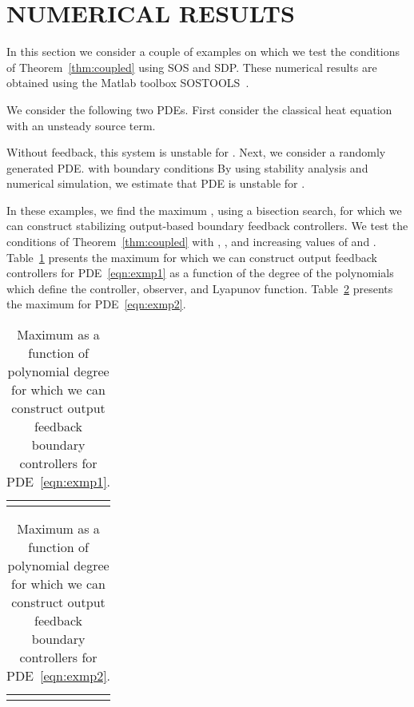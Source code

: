 \documentclass[US letter, 9 pt, conference]{ieeeconf}  \usepackage{setspace}
\begin{document}
\section{NUMERICAL RESULTS}\label{sec:num_results}
In this section we consider a couple of examples on which we test the conditions of Theorem~\ref{thm:coupled} using SOS and SDP. These numerical results are obtained using the Matlab toolbox SOSTOOLS~\cite{prajna2001introducing}.

We consider the following two PDEs. First consider the classical heat equation with an unsteady source term.

Without feedback, this system is unstable for . Next, we consider a randomly generated PDE.
 with boundary conditions
 By using stability analysis and numerical simulation, we estimate that PDE is unstable for .

In these examples, we find the maximum , using a bisection search, for which we can construct stabilizing output-based boundary feedback controllers. We test the conditions of Theorem~\ref{thm:coupled} with , ,  and increasing values of  and . Table~\ref{table:exmp1:cont} presents the maximum   for which we can construct output feedback controllers for PDE~\eqref{eqn:exmp1} as a function of the degree  of the polynomials which define the controller, observer, and Lyapunov function. Table~\ref{table:exmp2:cont} presents the maximum  for PDE~\eqref{eqn:exmp2}.

\begin{table}{}
\caption{Maximum  as a function of polynomial degree  for which we can construct output feedback boundary controllers for PDE~\eqref{eqn:exmp1}.}
\vspace{-10pt}
\begin{center}
    \begin{tabular}{l *{7}{c}}\hline
   &  &  &  &   \\ \hline
   &  &  &  & 
\end{tabular}
\end{center}
\label{table:exmp1:cont}
\end{table}

\begin{table}{}
\caption{Maximum  as a function of polynomial degree  for which we can construct output feedback boundary controllers for PDE~\eqref{eqn:exmp2}.}
\vspace{-10pt}
\begin{center}
    \begin{tabular}{l *{7}{c}}\hline
   &  &  &  &   \\ \hline
   &  &  &  & 
\end{tabular}
\end{center}
\label{table:exmp2:cont}
\end{table}
\end{document}
